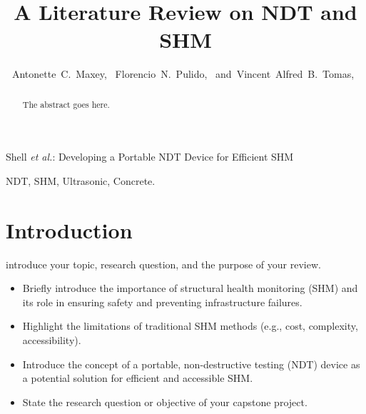 \documentclass[journal, a4paper]{IEEEtran}
\begin{document}
\title{A Literature Review on NDT and SHM}


\author{Antonette~C.~Maxey,~
        Florencio~N.~Pulido,~
        and~Vincent~Alfred~B.~Tomas,~%
}



%
{Shell \MakeLowercase{\textit{et al.}}: Developing a Portable NDT Device for Efficient SHM}


\maketitle


\begin{abstract}
The abstract goes here. \lipsum[1]
\end{abstract}


\begin{IEEEkeywords}
  NDT, SHM, Ultrasonic, Concrete.
\end{IEEEkeywords}







\section{Introduction}
 introduce your topic, research question, and the purpose of your review. \lipsum[1]
\begin{itemize}
  \item Briefly introduce the importance of structural health monitoring (SHM) and its role in ensuring safety and preventing infrastructure failures.
  \item Highlight the limitations of traditional SHM methods (e.g., cost, complexity, accessibility).
  \item Introduce the concept of a portable, non-destructive testing (NDT) device as a potential solution for efficient and accessible SHM.
  \item State the research question or objective of your capstone project.
\end{itemize}
\end{document}

